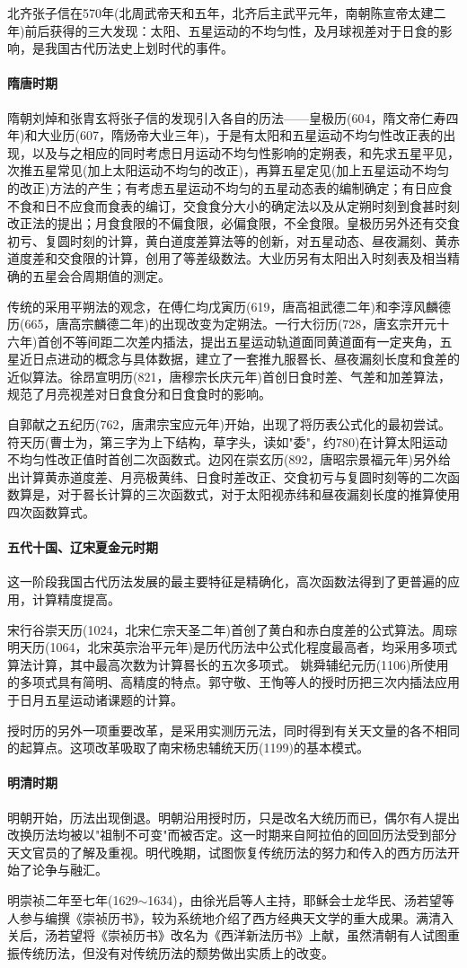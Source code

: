 北齐张子信在570年(北周武帝天和五年，北齐后主武平元年，南朝陈宣帝太建二年)前后获得的三大发现：太阳、五星运动的不均匀性，及月球视差对于日食的影响，是我国古代历法史上划时代的事件。
\paragraph{隋唐时期}
隋朝刘焯和张胄玄将张子信的发现引入各自的历法——皇极历(604，隋文帝仁寿四年)和大业历(607，隋炀帝大业三年)，于是有太阳和五星运动不均匀性改正表的出现，以及与之相应的同时考虑日月运动不均匀性影响的定朔表，和先求五星平见，次推五星常见(加上太阳运动不均匀的改正)，再算五星定见(加上五星运动不均匀的改正)方法的产生；有考虑五星运动不均匀的五星动态表的编制确定；有日应食不食和日不应食而食表的编订，交食食分大小的确定法以及从定朔时刻到食甚时刻改正法的提出；月食食限的不偏食限，必偏食限，不全食限。皇极历另外还有交食初亏、复圆时刻的计算，黄白道度差算法等的创新，对五星动态、昼夜漏刻、黄赤道度差和交食限的计算，创用了等差级数法。大业历另有太阳出入时刻表及相当精确的五星会合周期值的测定。

传统的采用平朔法的观念，在傅仁均戊寅历(619，唐高祖武德二年)和李淳风麟德历(665，唐高宗麟德二年)的出现改变为定朔法。一行大衍历(728，唐玄宗开元十六年)首创不等间距二次差内插法，提出五星运动轨道面同黄道面有一定夹角，五星近日点进动的概念与具体数据，建立了一套推九服晷长、昼夜漏刻长度和食差的近似算法。徐昂宣明历(821，唐穆宗长庆元年)首创日食时差、气差和加差算法，规范了月亮视差对日食食分和日食食时的影响。

自郭献之五纪历(762，唐肃宗宝应元年)开始，出现了将历表公式化的最初尝试。符天历(曹士为，第三字为上下结构，草字头，读如"委"，约780)在计算太阳运动不均匀性改正值时首创二次函数式。边冈在崇玄历(892，唐昭宗景福元年)另外给出计算黄赤道度差、月亮极黄纬、日食时差改正、交食初亏与复圆时刻等的二次函数算是，对于晷长计算的三次函数式，对于太阳视赤纬和昼夜漏刻长度的推算使用四次函数算式。
\paragraph{五代十国、辽宋夏金元时期}这一阶段我国古代历法发展的最主要特征是精确化，高次函数法得到了更普遍的应用，计算精度提高。

宋行谷崇天历(1024，北宋仁宗天圣二年)首创了黄白和赤白度差的公式算法。周琮明天历(1064，北宋英宗治平元年)是历代历法中公式化程度最高者，均采用多项式算法计算，其中最高次数为计算晷长的五次多项式。
姚舜辅纪元历(1106)所使用的多项式具有简明、高精度的特点。郭守敬、王恂等人的授时历把三次内插法应用于日月五星运动诸课题的计算。

授时历的另外一项重要改革，是采用实测历元法，同时得到有关天文量的各不相同的起算点。这项改革吸取了南宋杨忠辅统天历(1199)的基本模式。
\paragraph{明清时期}
明朝开始，历法出现倒退。明朝沿用授时历，只是改名大统历而已，偶尔有人提出改换历法均被以"祖制不可变"而被否定。这一时期来自阿拉伯的回回历法受到部分天文官员的了解及重视。明代晚期，试图恢复传统历法的努力和传入的西方历法开始了论争与融汇。

明崇祯二年至七年(1629$\sim$1634)，由徐光启等人主持，耶稣会士龙华民、汤若望等人参与编撰《崇祯历书》，较为系统地介绍了西方经典天文学的重大成果。满清入关后，汤若望将《崇祯历书》改名为《西洋新法历书》上献，虽然清朝有人试图重振传统历法，但没有对传统历法的颓势做出实质上的改变。